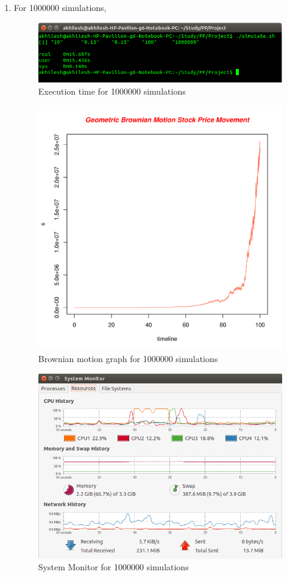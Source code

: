 \documentclass[10pt,a4paper]{article}
\begin{document}
\begin{enumerate}
\newpage
\item For 1000000 simulations,\\
\begin{figure}[h]
\centering
\includegraphics[scale=0.5]{1000000}
\caption{Execution time for 1000000 simulations}
\end{figure}
\begin{figure}[h]
\centering
\includegraphics[scale=0.5]{1000000_graph.pdf}
\caption{Brownian motion graph for 1000000 simulations}
\end{figure}
\begin{figure}[H]
\centering
\includegraphics[scale=0.4]{1000000_sys_mon}
\caption{System Monitor for 1000000 simulations}
\end{figure}

\end{enumerate}
\end{document}

